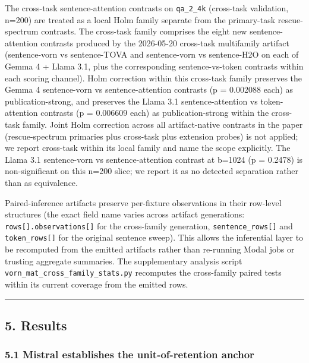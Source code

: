 \documentclass[
]{article}
\begin{document}
The cross-task sentence-attention contrasts on \texttt{qa\_2\_4k}
(cross-task validation, n=200) are treated as a local Holm family
separate from the primary-task rescue-spectrum contrasts. The cross-task
family comprises the eight new sentence-attention contrasts produced by
the 2026-05-20 cross-task multifamily artifact (sentence-vorn vs
sentence-TOVA and sentence-vorn vs sentence-H2O on each of
Gemma 4 + Llama 3.1, plus the corresponding sentence-vs-token contrasts
within each scoring channel). Holm correction within this cross-task
family preserves the Gemma 4 sentence-vorn vs sentence-attention
contrasts (p = 0.002088 each) as publication-strong, and preserves the
Llama 3.1 sentence-attention vs token-attention contrasts (p = 0.006609
each) as publication-strong within the cross-task family. Joint Holm
correction across all artifact-native contrasts in the paper
(rescue-spectrum primaries plus cross-task plus extension probes) is not
applied; we report cross-task within its local family and name the scope
explicitly. The Llama 3.1 sentence-vorn vs sentence-attention contrast
at b=1024 (p = 0.2478) is non-significant on this n=200 slice; we report
it as no detected separation rather than as equivalence.

Paired-inference artifacts preserve per-fixture observations in their
row-level structures (the exact field name varies across artifact
generations: \texttt{rows{[}{]}.observations{[}{]}} for the cross-family
generation, \texttt{sentence\_rows{[}{]}} and \texttt{token\_rows{[}{]}}
for the original sentence sweep). This allows the inferential layer to
be recomputed from the emitted artifacts rather than re-running Modal
jobs or trusting aggregate summaries. The supplementary analysis script
\texttt{vorn\_mat\_cross\_family\_stats.\allowbreak{}py} recomputes the cross-family
paired tests within its current coverage from the emitted rows.

\begin{center}\rule{0.5\linewidth}{0.5pt}\end{center}

\subsection{5. Results}\label{5-results}

\subsubsection{5.1 Mistral establishes the unit-of-retention
anchor}\label{51-mistral-establishes-the-unit-of-retention-anchor}
\end{document}
